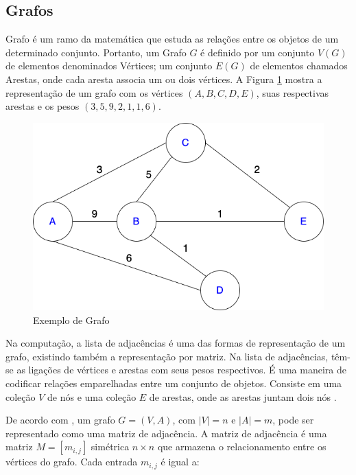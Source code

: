 \subsection{Grafos}

\label{sec:grafos}
Grafo é um ramo da matemática que estuda as relações entre os objetos de um determinado conjunto. Portanto, um Grafo $G$ é definido por um conjunto $V(G)$ de elementos denominados Vértices; um conjunto $E(G)$ de elementos chamados Arestas, onde cada aresta associa um ou dois vértices. A Figura \ref{grafo_1} mostra a representação de um grafo com os vértices $(A, B, C, D, E)$, suas respectivas arestas e os pesos $(3, 5, 9, 2, 1, 1, 6)$.

\begin{figure}[H]
    \begin{center}
        \caption{Exemplo de Grafo}
        \label{grafo_1}
        \includegraphics[scale=0.5]{figuras/referencial_teorico/Grafo.drawio.png}
    \end{center}
\end{figure}

Na computação, a lista de adjacências é uma das formas de representação de um grafo, existindo também a representação por matriz. Na lista de adjacências, têm-se as ligações de vértices e arestas com seus pesos respectivos. É uma maneira de codificar relações emparelhadas entre um conjunto de objetos. Consiste em uma coleção $V$ de nós e uma coleção $E$ de arestas, onde as arestas juntam dois nós \cite{Kleinberg+Tardos:06a}.

De acordo com ,  um grafo $G = (V, A)$, com $|V| = n$ e $|A| = m$, pode ser representado como uma matriz de adjacência. A matriz de adjacência é uma matriz $M = [m_{i,j}]$ simétrica  $n\times n$ que armazena o relacionamento entre os vértices do grafo. Cada entrada $m_{i,j}$ é igual a:

